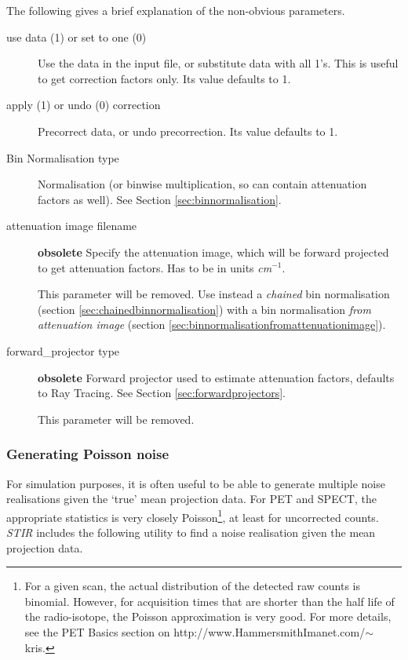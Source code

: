 \documentclass{article}
\begin{document}
The following gives a brief explanation of the non-obvious parameters. 

\begin{description}

\item[use data (1) or set to one (0)]
Use the data in the input file, or substitute data with all 1's. 
This is useful to get correction factors only. Its value defaults 
to 1.

\item[apply (1) or undo (0) correction]
Precorrect data, or undo precorrection. Its value defaults to 
1.

\item[Bin Normalisation type]
Normalisation (or binwise multiplication, so can contain attenuation 
factors as well). See Section \ref{sec:binnormalisation}.


\item[attenuation image filename] \textbf{obsolete}
Specify the attenuation image, which will be forward projected 
to get attenuation factors. Has to be in units \textit{cm}$^{\mathit{-1}}$.


This parameter will be removed. Use instead a \textit{chained} 
bin normalisation (section \ref{sec:chainedbinnormalisation}) 
with a bin normalisation 
\textit{from attenuation image} (section \ref{sec:binnormalisationfromattenuationimage}).


\item[forward\_projector type] \textbf{obsolete}
Forward projector used to estimate attenuation factors, defaults 
to Ray Tracing. See Section \ref{sec:forwardprojectors}.

This parameter will be removed.
\end{description}


\subsubsection{
Generating Poisson noise}

For simulation purposes, it is often useful to be able to generate 
multiple noise realisations given the `true' mean projection data. 
For PET and SPECT, the appropriate statistics is very closely 
Poisson\footnote{{\small For a given scan, the actual distribution of 
the detected raw counts is binomial. However, for acquisition 
times that are shorter than the half life of the radio-isotope, 
the Poisson approximation is very good. For more details, see 
the PET Basics section on http://www.HammersmithImanet.com/\ensuremath{\sim}kris.}}, 
at least for uncorrected counts. \textit{STIR} includes the following 
utility to find a noise realisation given the mean projection 
data.
\end{document}
